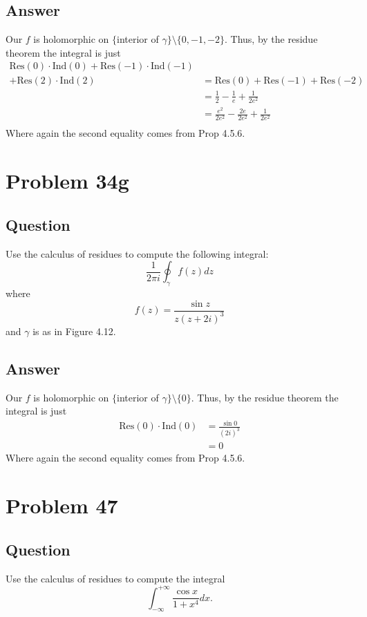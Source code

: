 \documentclass[11pt]{article}
\begin{document}
\subsection{Answer}
Our $f$ is holomorphic on  $\{$interior of $\gamma\} \setminus \{0,-1,-2\}$. Thus, by the residue theorem the integral is just 
\begin{align*}\mbox{Res}(0) \cdot \mbox{Ind}(0) + \mbox{Res}(-1) \cdot \mbox{Ind}(-1) \\
+ \mbox{Res}(2) \cdot \mbox{Ind}(2) &= \mbox{Res}(0) + \mbox{Res}(-1) + \mbox{Res}(-2)  \\
&=\frac{1}{2}-\frac{1}{e}+ \frac{1}{2e^2}\\
&= \frac{e^2}{2e^2} - \frac{2e}{2 e ^2} +\frac{1}{2 e^2}\\
\end{align*}
Where again the second equality comes from Prop 4.5.6.

\section{Problem 34g}
\subsection{Question}
Use the calculus of residues to compute the following integral:
\[\frac{1}{2 \pi i} \oint_\gamma f(z) dz\]
where
\[f(z) = \frac{\sin z}{z(z+2i)^3}\]
and $\gamma$ is as in Figure 4.12.
\subsection{Answer}
Our $f$ is holomorphic on  $\{$interior of $\gamma\} \setminus \{0\}$. Thus, by the residue theorem the integral is just 
\begin{align*}\mbox{Res}(0) \cdot \mbox{Ind}(0) &=  \frac{\sin 0}{(2i)^3}\\&=0
\end{align*}
Where again the second equality comes from Prop 4.5.6.



\section{Problem 47}
\subsection{Question}
Use the calculus of residues to compute the integral
\[\int_{-\infty}^{+\infty} \frac{\cos x}{1+x^4} dx.\]
\end{document}

